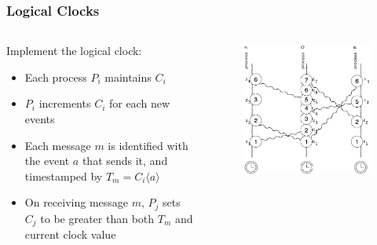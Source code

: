 \documentclass{beamer}
\begin{document}
\frame
{
	\frametitle{Logical Clocks}

	\begin{columns}
	\begin{column}{0.6\textwidth}

		Implement the logical clock:

		\begin{itemize}
			\item<2-> Each process $P_i$ maintains $C_i$
			\item<3-> $P_i$ increments $C_i$ for each new events
			\item<4-> Each message $m$ is identified with the event $a$ that sends it, and timestamped by $T_m=C_i\langle a\rangle$
			\item<5-> On receiving message $m$, $P_j$ sets $C_j$ to be greater than both $T_m$ and current clock value
		\end{itemize}


	\end{column}
	\begin{column}{0.4\textwidth}

		\begin{figure}[ht!]
		\includegraphics[width=\textwidth]{files/ClockDist-Logical-Clock.png}
		\end{figure}


	\end{column}
	\end{columns}


}
\end{document}
